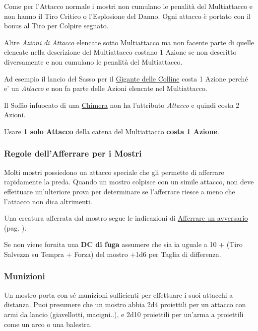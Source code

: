 \begin{multicols}{2}
Come per l'Attacco normale i mostri non cumulano le penalità del Multiattacco e non hanno il Tiro Critico o l'Esplosione del Danno. Ogni attacco è portato con il bonus al Tiro per Colpire segnato.

Altre \emph{Azioni di Attacco} elencate sotto Multiattacco ma non facente parte di quelle elencate nella descrizione del Multiattacco costano 1 Azione se non descritto diversamente e non cumulano le penalità del Multiattacco.

Ad esempio il lancio del Sasso per il \hyperlink{Gigante delle Colline}{Gigante delle Colline} costa 1 Azione perché e' un \emph{Attacco} e non fa parte delle Azioni elencate nel Multiattacco.

Il Soffio infuocato di una \hyperlink{Chimera}{Chimera} non ha l'attributo \emph{Attacco} e quindi costa 2 Azioni.

Usare \textbf{1 solo Attacco} della catena del Multiattacco \textbf{costa 1 Azione}.

\subsubsection{Regole dell'Afferrare per i Mostri}

Molti mostri possiedono un attacco speciale che gli permette di afferrare rapidamente la preda. Quando un mostro colpisce con un simile attacco, non deve effettuare un'ulteriore prova per determinare se l'afferrare riesce a meno che l'attacco non dica altrimenti.

Una creatura afferrata dal mostro segue le indicazioni di \hyperlink{afferrareunavversario}{Afferrare un avversario} (pag. \pageref{afferrareunavversario}).

Se non viene fornita una \textbf{DC di fuga} assumere che sia ia uguale a 10 + (Tiro Salvezza su Tempra  + Forza) del mostro +1d6 per Taglia di differenza.

\subsubsection{Munizioni}

Un mostro porta con sé munizioni sufficienti per effettuare i suoi attacchi a distanza. Puoi presumere che un mostro abbia 2d4 proiettili per un attacco con armi da lancio (giavellotti, macigni..), e 2d10 proiettili per un'arma a proiettili come un arco o una balestra.


\end{multicols}
